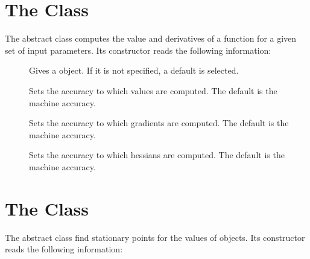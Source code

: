 

\section{The  Class}\label{Function}

The  abstract class computes the value and
derivatives of a function for a given set of input
parameters.  Its  constructor reads the
following information:

\begin{description}
  \item[] Gives a  object.
    If it is not specified, a default 
    is selected.

  \item[] Sets the accuracy to which values are
    computed.  The default is the machine accuracy.

  \item[] Sets the accuracy to which gradients
    are computed.  The default is the machine accuracy.

  \item[] Sets the accuracy to which hessians are
    computed.  The default is the machine accuracy.

\end{description}


\section{The  Class}\label{Optimize}

The  abstract class find stationary points for the values
of  objects.  Its  constructor reads
the following information:


